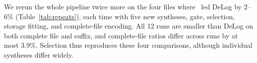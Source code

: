 We rerun the whole pipeline twice more on the four files where \tool\ led DeLog by 2--6\% (Table~\ref{tab:repeats}), each time with five new syntheses, gate, selection, storage fitting, and complete-file encoding. All 12 runs are smaller than DeLog on both complete file and suffix, and complete-file ratios differ across runs by at most 3.9\%. Selection thus reproduces these four comparisons, although individual syntheses differ widely.
